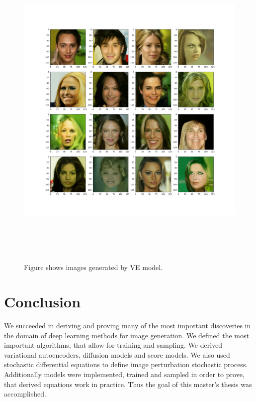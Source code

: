 \documentclass[10pt]{article}
\begin{document}
\begin{figure}[H]
\hspace*{-2cm}  
    \includegraphics[width=16cm, height = 16cm]{ve_sde.png}
    \caption{Figure shows images generated by VE model.}
\label{fig:ve_example}
\end{figure}


\section{Conclusion}

We succeeded in deriving and proving many of the most important discoveries in the domain of deep learning methods for image generation. We defined the most important algorithms, that allow for training and sampling. We derived variational autoencoders, diffusion models and score models. We also used stochastic differential equations to define image perturbation stochastic process. Additionally models were implemented, trained and sampled in order to prove, that derived equations work in practice. Thus the goal of this master's thesis was accomplished.
\end{document}
